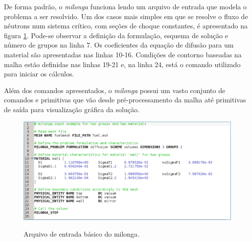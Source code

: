 


De forma padrão, o \textit{milonga} funciona lendo um arquivo de entrada que modela o
problema a ser resolvido. Um dos casos mais simples em que se resolve o fluxo de nêutrons
num sistema crítico, com seções de choque constantes, é apresentado na figura \ref{fig:inputmilonga}.
Pode-se observar a definição da formulação, esquema de solução e número de grupos na linha 7.
Os coeficientes da equação de difusão para um material são apresentadas nas linhas 10-16.
Condições de contorno baseadas na malha estão definidas nas linhas 19-21 e, na linha 24,
está o comando utilizado para iniciar os cálculos.

Além dos comandos apresentados, o \textit{milonga} possui um vasto conjunto de comandos e primitivas
que vão desde pré-processamento da malha até primitivas de saída para visualização gráfica da
solução.

\begin{figure}[htb]
  \caption{Arquivo de entrada básico do milonga. }
  \centering\includegraphics[scale=0.19]{figuras/milonga_example2.png}
  \label{fig:inputmilonga}
\end{figure}

